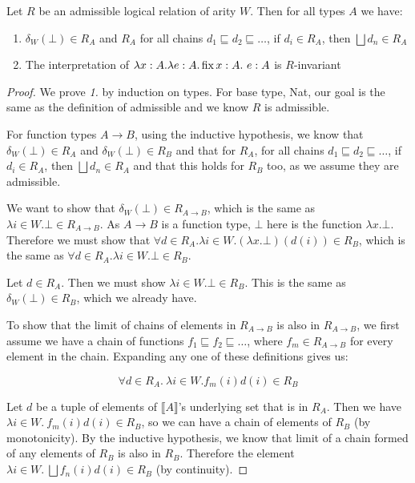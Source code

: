 \begin{thm}
Let $R$ be an admissible logical relation of arity $W$. Then for all types $A$ we have:

\begin{enumerate}
\item{$\delta_W(\bot) \in R_A$ and $R_A$ for all chains $d_1 \sqsubseteq d_2 \sqsubseteq \dots$, if  $d_i \in R_A$, then $\bigsqcup d_n \in R_A$}
\item{The interpretation of $\lambda x : A. \lambda e : A. \operatorname{fix} x : A. \ e : A$ is $R$-invariant}
\end{enumerate}
\end{thm}

\begin{proof}
We prove \emph{1.} by induction on types. For base type, Nat, our goal is the same as the definition of admissible and we know $R$ is admissible. 

For function types $A \to B$, using the inductive hypothesis, we know that $\delta_W(\bot) \in R_A$ and $\delta_W(\bot) \in R_B$ and that for $R_A$, for all chains $d_1 \sqsubseteq d_2 \sqsubseteq \dots$, if  $d_i \in R_A$, then $\bigsqcup d_n \in R_A$ and that this holds for $R_B$ too, as we assume they are admissible. 

We want to show that $\delta_W(\bot) \in R_{A \to B}$, which is the same as $\lambda i \in W. \bot \in R_{A \to B}$. As $A \to B$ is a function type, $\bot$ here is the function $\lambda x. \bot$. Therefore we must show that $\forall d \in R_A. \lambda i \in W. (\lambda x. \bot)(d(i)) \in R_B$, which is the same as $\forall d \in R_A. \lambda i \in W. \bot \in R_B$.

Let $d \in R_A$. Then we must show $\lambda i \in W. \bot \in R_B$. This is the same as $\delta_W(\bot) \in R_B$, which we already have.

\vspace{0.5cm}

To show that the limit of chains of elements in  $R_{A \to B}$ is also in $R_{A \to B}$, we first assume we have a chain of functions $f_1 \sqsubseteq f_2 \sqsubseteq \dots$, where $f_m \in R_{A \to B}$ for every element in the chain. Expanding any one of these definitions gives us:

\[ \forall d \in R_A. \ \lambda i \in W. f_m(i)d(i) \in R_B\]

Let $d$ be a tuple of elements of $\llbracket A \rrbracket$'s underlying set that is in $R_A$. Then we have $\lambda i \in W. \ f_m(i)d(i) \in R_B$, so we can have a chain of elements of $R_B$ (by monotonicity). By the inductive hypothesis, we know that limit of a chain formed of  any elements of $R_B$ is also in $R_B$. Therefore the element $\lambda i \in W. \ \bigsqcup f_n(i)d(i) \in R_B$ (by continuity).


\end{proof}
